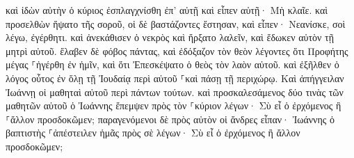 \documentclass{openreader}
\begin{document}
καὶ ἰδὼν αὐτὴν ὁ κύριος ἐσπλαγχνίσθη ἐπ’ αὐτῇ καὶ εἶπεν αὐτῇ· Μὴ κλαῖε. 
καὶ προσελθὼν ἥψατο τῆς σοροῦ, οἱ δὲ βαστάζοντες ἔστησαν, καὶ εἶπεν· Νεανίσκε, σοὶ λέγω, ἐγέρθητι. 
καὶ ἀνεκάθισεν ὁ νεκρὸς καὶ ἤρξατο λαλεῖν, καὶ ἔδωκεν αὐτὸν τῇ μητρὶ αὐτοῦ. 
ἔλαβεν δὲ φόβος πάντας, καὶ ἐδόξαζον τὸν θεὸν λέγοντες ὅτι Προφήτης μέγας ⸀ἠγέρθη ἐν ἡμῖν, καὶ ὅτι Ἐπεσκέψατο ὁ θεὸς τὸν λαὸν αὐτοῦ. 
καὶ ἐξῆλθεν ὁ λόγος οὗτος ἐν ὅλῃ τῇ Ἰουδαίᾳ περὶ αὐτοῦ ⸀καὶ πάσῃ τῇ περιχώρῳ. 
Καὶ ἀπήγγειλαν Ἰωάννῃ οἱ μαθηταὶ αὐτοῦ περὶ πάντων τούτων. καὶ προσκαλεσάμενος δύο τινὰς τῶν μαθητῶν αὐτοῦ ὁ Ἰωάννης 
ἔπεμψεν πρὸς τὸν ⸀κύριον λέγων· Σὺ εἶ ὁ ἐρχόμενος ἢ ⸀ἄλλον προσδοκῶμεν; 
παραγενόμενοι δὲ πρὸς αὐτὸν οἱ ἄνδρες εἶπαν· Ἰωάννης ὁ βαπτιστὴς ⸀ἀπέστειλεν ἡμᾶς πρὸς σὲ λέγων· Σὺ εἶ ὁ ἐρχόμενος ἢ ἄλλον προσδοκῶμεν; 
\end{document}
